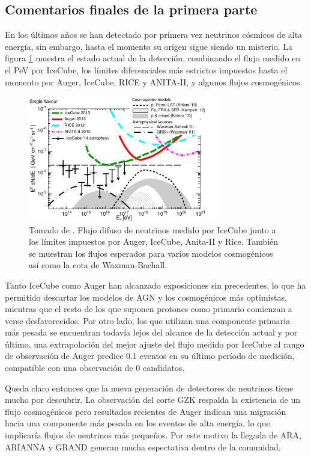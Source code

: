 	\subsection{Comentarios finales de la primera parte}
	En los \'ultimos a\~nos se han detectado por primera vez neutrinos c\'osmicos de alta energ\'ia, sin embargo, hasta el momento su origen sigue siendo un misterio.
	La figura \ref{fig:multimess} muestra el estado actual de la detecci\'on, combinando el flujo medido en el PeV por IceCube, los l\'imites diferenciales m\'as estrictos impuestos hasta el momento por Auger, IceCube, RICE y ANITA-II, y algunos flujos cosmog\'enicos.
	\begin{figure}[ht]
		\begin{center}
		\includegraphics[width=0.75\textwidth]{fig/introduccion/1510-02050_multimessenger}
		\caption{\label{fig:multimess} Tomado de \cite{cite:multimess}. Flujo difuso de neutrinos medido por IceCube junto a los l\'imites impuestos por Auger, IceCube, Anita-II y Rice. Tambi\'en se muestran los flujos esperados para varios modelos cosmog\'enicos as\'i como la cota de Waxman-Bachall.}
		\end{center}
	\end{figure}
	
	Tanto IceCube como Auger han alcanzado exposiciones sin precedentes, lo que ha permitido descartar los modelos de AGN y los cosmog\'enicos m\'as optimistas, mientras que el resto de los que suponen protones como primario comienzan a verse desfavorecidos.
	Por otro lado, los que utilizan una componente primaria m\'as pesada se encuentran todav\'ia lejos del alcance de la detecci\'on actual y por \'ultimo, una extrapolaci\'on del mejor ajuste del flujo medido por IceCube al rango de observaci\'on de Auger predice 0.1 eventos en su \'ultimo per\'iodo de medici\'on, compatible con una observaci\'on de 0 candidatos.
	
	Queda claro entonces que la nueva generaci\'on de detectores de neutrinos tiene mucho por descubrir.
	La observaci\'on del corte GZK respalda la existencia de un flujo cosmog\'enicos pero resultados recientes de Auger indican una migraci\'on hacia una componente m\'as pesada en los eventos de alta energ\'ia, lo que implicar\'ia flujos de neutrinos m\'as peque\~nos.
	Por este motivo la llegada de ARA, ARIANNA y GRAND generan mucha espectativa dentro de la comunidad.
	
